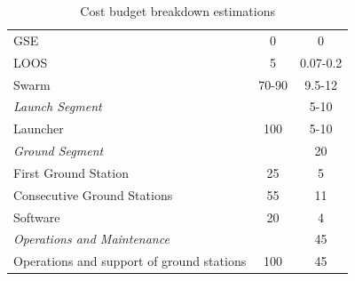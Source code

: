 \begin{table}[htbp]
\begin{tabular}{p{10cm} | c | c }
       \hspace{2.5cm}GSE &         0 &          0\\

      \hspace{2.5cm}LOOS &         5 &         0.07-0.2 \\ \hline

     \hspace{2.0cm}Swarm &         70-90 &         9.5-12 \\ \hline

\textit{Launch Segment} &         &         5-10 \\ \hline

  \hspace{1.0cm}Launcher &         100 &        5-10  \\ \hline

\textit{Ground Segment} &          &     20     \\ \hline

\hspace{1.0cm}First Ground Station &         25 &      5    \\

\hspace{1.0cm}Consecutive Ground Stations &         55 &     11     \\

\hspace{1.0cm}Software &         20 &     4     \\ \hline

\textit{Operations and Maintenance} &          &        45  \\ \hline

\hspace{1.0cm}Operations and support of ground stations &         100 &   45       \\
	
\end{tabular} 
\caption{Cost budget breakdown estimations}
	\label{tab:CostBreakdown} 
\end{table}

